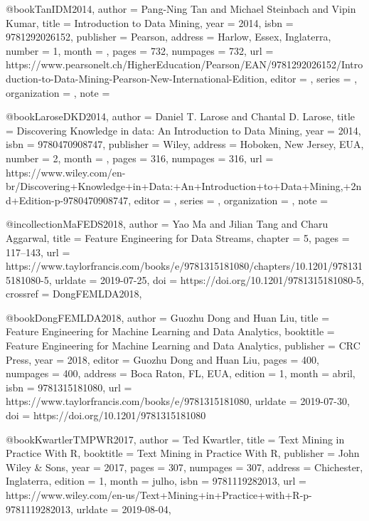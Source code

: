 @book{TanIDM2014,
    author = {Pang-Ning Tan and Michael Steinbach and Vipin Kumar},
    title = {Introduction to Data Mining},
    year = {2014},
    isbn = {9781292026152},
    publisher = {Pearson},
    address = {Harlow, Essex, Inglaterra},
    number = {1},
    month = {},
    pages = {732},
    numpages = {732},
    url = {https://www.pearsonelt.ch/HigherEducation/Pearson/EAN/9781292026152/Introduction-to-Data-Mining-Pearson-New-International-Edition},
    editor		= {},
    series		= {},
    organization	= {},
    note		= {}
} 

@book{LaroseDKD2014,
    author = {Daniel T. Larose and Chantal D. Larose},
    title = {Discovering Knowledge in data: An Introduction to Data Mining},
    year = {2014},
    isbn = {9780470908747},
    publisher = {Wiley},
    address = {Hoboken, New Jersey, EUA},
    number = {2},
    month = {},
    pages = {316},
    numpages = {316},
    url = {https://www.wiley.com/en-br/Discovering+Knowledge+in+Data:+An+Introduction+to+Data+Mining,+2nd+Edition-p-9780470908747},
    editor		= {},
    series		= {},
    organization	= {},
    note		= {}
} 

@incollection{MaFEDS2018,
  author       = {Yao Ma and Jilian Tang and Charu Aggarwal},
  title        = {{F}eature {E}ngineering for {D}ata {S}treams},
  chapter      = {5},
  pages        = {117--143},
  url          = {https://www.taylorfrancis.com/books/e/9781315181080/chapters/10.1201/9781315181080-5},
  urldate      = {2019-07-25},
  doi          = {https://doi.org/10.1201/9781315181080-5},
  crossref = {DongFEMLDA2018},
}

@book{DongFEMLDA2018,
  author       = {Guozhu Dong and Huan Liu}, 
  title        = {Feature Engineering for Machine Learning and Data Analytics},
  booktitle    = {Feature Engineering for Machine Learning and Data Analytics},
  publisher    = {CRC Press},
  year         = {2018},
  editor       = {Guozhu Dong and Huan Liu},
  pages        = {400},
  numpages     = {400},
  address      = {Boca Raton, FL, EUA},
  edition      = {1},
  month        = {abril},
  isbn         = {9781315181080},
  url          = {https://www.taylorfrancis.com/books/e/9781315181080},
  urldate      = {2019-07-30},
  doi          = {https://doi.org/10.1201/9781315181080}
}

@book{KwartlerTMPWR2017,
  author       = {Ted Kwartler}, 
  title        = {Text Mining in Practice With R},
  booktitle    = {Text Mining in Practice With R},
  publisher    = {John Wiley \& Sons},
  year         = {2017},
  pages        = {307},
  numpages     = {307},
  address      = {Chichester, Inglaterra},
  edition      = {1},
  month        = {julho},
  isbn         = {9781119282013},
  url          = {https://www.wiley.com/en-us/Text+Mining+in+Practice+with+R-p-9781119282013},
  urldate      = {2019-08-04},
}

